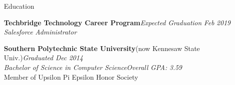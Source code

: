 \begin{rSection}{Education}

{\bf Techbridge Technology Career Program}\hfill {\em Expected Graduation Feb 2019} \\
{\em Salesforce Administrator}

{\bf Southern Polytechnic State University}{\footnotesize (now Kennesaw State Univ.)}\hfill{\em Graduated Dec 2014}\\
{\em Bachelor of Science in Computer Science}\hfill{\em Overall GPA: 3.59}\\
Member of Upsilon Pi Epsilon Honor Society

\end{rSection}